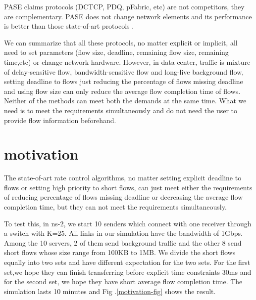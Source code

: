\documentclass[10pt, conference, letterpaper]{IEEEtran}
\begin{document}
PASE \cite{PASE} claims protocols (DCTCP, PDQ, pFabric, etc) are not competitors, 
they are complementary. 
PASE does not change network elements and its
performance is better than those state-of-art protocols \cite{PASE}.


We can summarize that all these protocols, no matter explicit or implicit, 
all need to set parameters (flow size, deadline, remaining flow size, remaining time,etc) or change network
hardware.
However, in data center, traffic is mixture of delay-sensitive flow, bandwidth-sensitive flow and long-live background flow, setting deadline to flows
just reducing the percentage of flows missing deadline and using flow size can only reduce the average flow completion time of flows.
Neither of the methods can meet both the demands at the same time.
What we need is to meet the requirements simultaneously and do not need the user to provide flow information beforehand.



\begin{figure*}[!htb]
\centering
{}
\caption{motivation example: 50\% of flows have explicit deadline while the other flows should transfer as quickly as possible }
\label{motivation-fig}
\end{figure*}




\section{motivation} \label{motivation}


The state-of-art rate control algorithms, no matter setting explicit deadline to flows or setting high priority to short flows, can just meet either the requirements of 
reducing percentage of flows missing deadline or decreasing the average flow completion time, but they can not meet the requirements simultaneously.

To test this, in ns-2, we start 10 senders which connect with one receiver through a switch with K=25.  
All links in our simulation have the bandwidth of 1Gbps. Among the 10 servers, 2 of them
send background traffic and the other 8  send short flows whose size range from 100KB to 1MB. 
We divide the short flows equally into two sets and have different expectation for the two sets.
For the first set,we hope they can finish transferring before explicit time constraints 30ms and for the second set, we hope they have short average flow completion time.
The simulation lasts 10 minutes and Fig .\ref{motivation-fig} shows the result.
\end{document}
